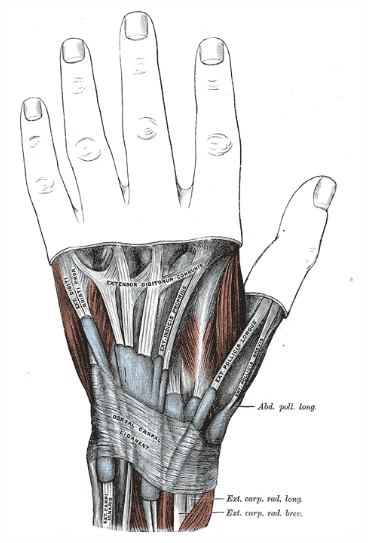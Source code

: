\documentclass[12pt]{article}
\begin{document}
\begin{figure}[h!]
\centering
\begin{minipage}{.5\textwidth}
\centering
\includegraphics[width=0.83\textwidth]{images/gray_tendons_dorsal.png}
\end{minipage}%
\begin{minipage}{.5\textwidth}
\centering

\end{minipage}
\end{figure}
\end{document}
